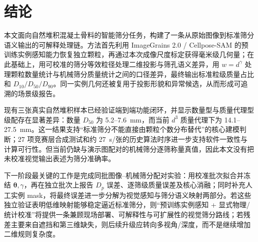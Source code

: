 \section{结论}
\label{sec:r-conclusion}

本文面向自然堆积混凝土骨料的智能筛分任务，构建了一条从原始图像到标准筛分语义输出的可解释处理链。方法首先利用 ImageGrains 2.0 / Cellpose-SAM 的预训练实例感知能力恢复独立颗粒，再通过本次成像尺度标定获得毫米级几何量；在此基础上，用可校准的筛分等效粒径处理二维投影与筛孔语义差异，用 $w=d^{\gamma}$ 处理颗粒数量统计与机械筛分质量统计之间的口径差异，最终输出标准粒级质量占比和 $D_{10}/D_{50}/D_{90}$。同一实例几何还被复用于投影形貌和异常候选，从而形成可追溯的场景级报告。

现有三张真实自然堆积样本已经验证端到端功能闭环，并显示数量型与质量代理型级配存在显著差异：数量 $D_{50}$ 为 5.2--7.6~mm，而当前 $d^3$ 质量代理下为 14.1--27.5~mm。这一结果支持“标准筛分不能直接由颗粒个数分布替代”的核心建模判断；27 项竞赛层合成测试和约 27~s/张的历史算法时序进一步支持软件一致性与计算可行性。但当前仍缺与演示图配对的机械筛分逐筛称量真值，因此本文没有把未校准视觉输出表述为筛分准确率。

下一阶段最关键的工作是完成同批图像--机械筛分配对实验：用校准批次拟合并冻结 $\boldsymbol{\theta},\gamma$，再在独立批次上报告 $D_p$ 误差、逐筛级质量误差及核心消融；同时补充人工实例 mask，将最终误差进一步分解为视觉感知与筛分语义映射两部分。若这些独立验证表明低维映射能够稳定逼近标准筛分，则“预训练实例感知 + 显式物理/统计校准”将提供一条兼顾现场部署、可解释性与可扩展性的视觉筛分路线；若残差主要来自遮挡和第三维缺失，则后续升级应转向多视角/深度，而不是继续增加二维规则复杂度。
